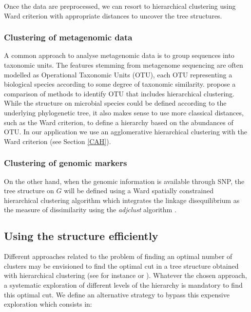 \documentclass[]{book}
\begin{document}
Once the data are preprocessed, we can resort to hierarchical clustering
using Ward criterion with appropriate distances to uncover the tree
structures.

\hypertarget{clustering-of-metagenomic-data}{%
\subsubsection{Clustering of metagenomic data}\label{clustering-of-metagenomic-data}}

A common approach to analyse metagenomic data is to group sequences into
taxonomic units. The features stemming from metagenome sequencing are
often modelled as Operational Taxonomic Units (OTU), each OTU
representing a biological species according to some degree of taxonomic
similarity. \citep{chen2013OTU} propose a comparison of methods to identify
OTU that includes hierarchical clustering. While the structure on
microbial species could be defined according to the underlying
phylogenetic tree, it also makes sense to use more classical distances,
such as the Ward criterion, to define a hierarchy based on the
abundances of OTU. In our application we use an agglomerative
hierarchical clustering with the Ward criterion (see Section \ref{CAH}).

\hypertarget{clustering-of-genomic-markers}{%
\subsubsection{Clustering of genomic markers}\label{clustering-of-genomic-markers}}

On the other hand, when the genomic information is available through
SNP, the tree structure on \(\mathit{G}\) will be defined using a Ward spatially
constrained hierarchical clustering algorithm which integrates the
linkage disequilibrium as the measure of dissimilarity using the
\emph{adjclust} algorithm \citep{dehman_performance_2015}.

\hypertarget{using-the-structure-efficiently}{%
\subsection{Using the structure efficiently}\label{using-the-structure-efficiently}}

Different approaches related to the problem of finding an optimal number
of clusters may be envisioned to find the optimal cut in a tree
structure obtained with hierarchical clustering (see for instance
\citep{Milligan:Ps1985} or \citep{Gordon:1999}). Whatever the chosen approach, a
systematic exploration of different levels of the hierarchy is mandatory
to find this optimal cut. We define an alternative strategy to bypass
this expensive exploration which consists in:
\end{document}
